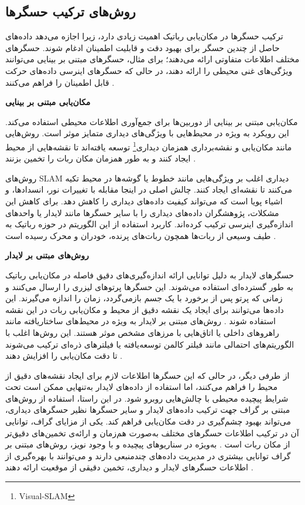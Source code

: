\subsection{روش‌های ترکیب حسگرها}

ترکیب حسگرها در مکان‌یابی رباتیک اهمیت زیادی دارد، زیرا اجازه می‌دهد داده‌های حاصل از چندین حسگر برای بهبود دقت و قابلیت اطمینان ادغام شوند. حسگرهای مختلف اطلاعات متفاوتی ارائه می‌دهند؛ برای مثال، حسگرهای مبتنی بر بینایی می‌توانند ویژگی‌های غنی محیطی را ارائه دهند، در حالی که حسگرهای اینرسی داده‌های حرکت قابل اطمینان را فراهم می‌کنند
\cite{srinivasan2007multiple}.

\textbf{مکان‌یابی مبتنی بر بینایی}

مکان‌یابی مبتنی بر بینایی از دوربین‌ها برای جمع‌آوری اطلاعات محیطی استفاده می‌کند. این رویکرد به ویژه در محیط‌هایی با ویژگی‌های دیداری متمایز موثر است. روش‌هایی مانند مکان‌یابی و نقشه‌برداری همزمان دیداری\footnote{Visual-SLAM}
 توسعه یافته‌اند تا نقشه‌هایی از محیط ایجاد کنند و به طور همزمان مکان ربات را تخمین بزنند
 \cite{westman2018underwater, hiebert2022introduction}.

روش‌های SLAM دیداری اغلب بر ویژگی‌هایی مانند خطوط یا گوشه‌ها در محیط تکیه می‌کنند تا نقشه‌ای ایجاد کنند. چالش اصلی در اینجا مقابله با تغییرات نور، انسدادها، و اشیاء پویا است که می‌تواند کیفیت داده‌های دیداری را کاهش دهد. برای کاهش این مشکلات، پژوهشگران داده‌های دیداری را با سایر حسگرها مانند لایدار یا واحدهای اندازه‌گیری اینرسی ترکیب کرده‌اند. کاربرد استفاده از این الگوریتم در حوزه رباتیک به طیف وسیعی از ربات‌ها همچون ربات‌های پرنده، خودران و محرک رسیده است
\cite{guan2021robot, khairuddin2015review, choset2001topological}.

\textbf{روش‌های مبتنی بر لایدار}

حسگرهای لایدار به دلیل توانایی ارائه اندازه‌گیری‌های دقیق فاصله در مکان‌یابی رباتیک به طور گسترده‌ای استفاده می‌شوند. این حسگرها پرتوهای لیزری را ارسال می‌کنند و زمانی که پرتو پس از برخورد با یک جسم بازمی‌گردد، زمان را اندازه می‌گیرند. این داده‌ها می‌توانند برای ایجاد یک نقشه دقیق از محیط و مکان‌یابی ربات در این نقشه استفاده شوند
 \cite{xu2019indoor}. 
روش‌های مبتنی بر لایدار به ویژه در محیط‌های ساختاریافته مانند راهروهای داخلی یا اتاق‌هایی با مرزهای مشخص موثر هستند. این روش‌ها اغلب با الگوریتم‌های احتمالی مانند فیلتر کالمن توسعه‌یافته یا فیلترهای ذره‌ای ترکیب می‌شوند تا دقت مکان‌یابی را افزایش دهند
 \cite{liu2022improved, blok2019robot}.
 
از طرفی دیگر، در حالی که این حسگرها اطلاعات لازم برای ایجاد نقشه‌های دقیق از محیط را فراهم می‌کنند، اما استفاده از داده‌های لایدار به‌تنهایی ممکن است تحت شرایط پیچیده محیطی با چالش‌هایی روبرو شود. در این راستا، استفاده از روش‌های مبتنی بر گراف جهت ترکیب داده‌های لایدار و سایر حسگرها نظیر حسگرهای دیداری، می‌تواند بهبود چشم‌گیری در دقت مکان‌یابی فراهم کند. یکی از مزایای گراف، توانایی آن در ترکیب اطلاعات حسگرهای مختلف به‌صورت هم‌زمان و ارائه‌ی تخمین‌های دقیق‌تر از مکان ربات است \cite{dai2022uav}. به‌ویژه در سناریوهای پیچیده و با وجود نویز، روش‌های مبتنی بر گراف توانایی بیشتری در مدیریت داده‌های چندمنبعی دارند و می‌توانند با بهره‌گیری از اطلاعات حسگرهای لایدار و دیداری، تخمین دقیقی از موقعیت ارائه دهند \cite{li2015gaussian}.
 

